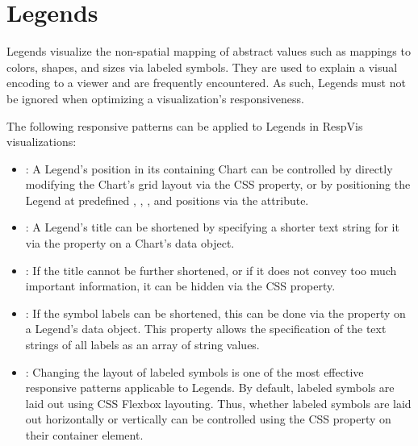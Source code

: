 \section{Legends}
\label{sec:LegendsUsage}

Legends visualize the non-spatial mapping of abstract values such as
mappings to colors, shapes, and sizes via labeled symbols. They are
used to explain a visual encoding to a viewer and are frequently
encountered. As such, Legends must not be ignored when optimizing a
visualization's responsiveness.

The following responsive patterns can be applied to Legends in RespVis
visualizations:
\begin{itemize}
\item {}: A Legend's position in its containing
  Chart can be controlled by directly modifying the Chart's grid
  layout via the CSS  property, or by positioning
  the Legend at predefined , ,
  , and  positions via the
   attribute.

\item {}: A Legend's title can be shortened by
  specifying a shorter text string for it via the 
  property on a Chart's data object.

\item {}: If the title cannot be further
  shortened, or if it does not convey too much important information,
  it can be hidden via the CSS  property.

\item {}: If the symbol labels can be
  shortened, this can be done via the  property on a
  Legend's data object. This property allows the specification of the
  text strings of all labels as an array of string values.

\item {}: Changing the layout of
  labeled symbols is one of the most effective responsive patterns
  applicable to Legends. By default, labeled symbols are laid out
  using CSS Flexbox layouting. Thus, whether labeled symbols are laid
  out horizontally or vertically can be controlled using the CSS
   property on their container element.
\end{itemize}





